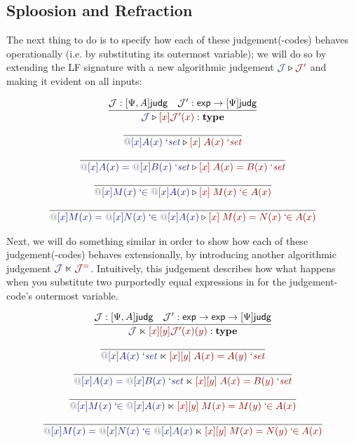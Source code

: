 \documentclass[acmtoplas]{acmtrans2m}
\makeatletter
\def\InputModeColorName{MidnightBlue}
\def\OutputModeColorName{Maroon}
\newcommand\InputMode[1]{{\color{\InputModeColorName}{#1}}}
\newcommand\OutputMode[1]{{\color{\OutputModeColorName}{#1}}}
\newcommand\type{\mathbf{type}}
\newcommand\sortexp{\mathsf{exp}}
\newcommand\sortj{\mathsf{judg}}
\newcommand\sortoj[1]{[#1]\sortj}
\newcommand\bind[2]{{\color{Gray}@}[#1]#2}
\newcommand\qisset[1]{#1\;`\mathit{set}}
\newcommand\qeqset[2]{#1=#2\;`\mathit{set}}
\newcommand\qmem[2]{#1\;`\!\!\in#2}
\newcommand\qeqmem[3]{#1=#2\;`\!\!\in#3}
\newcommand\sploot[2]{\InputMode{#1}\triangleright\OutputMode{#2}}
\newcommand\refract[2]{\InputMode{#1}\ltimes\OutputMode{#2}}
\newcommand\dname[1]{\mathcal{#1}}
\makeatother
\begin{document}
\subsection{Sploosion and Refraction}

The next thing to do is to specify how each of these judgement(-codes) behaves
operationally (i.e. by substituting its outermost variable); we will do so by
extending the LF signature with a new algorithmic judgement
$\sploot{\dname{J}}{\dname{J}'}$ and making it evident on all inputs:

\begin{gather*}
  \infer{
    \sploot{\dname{J}}{[x]\dname{J}'(x)}:\type
  }{
    \dname{J}:\sortoj{\Psi,A} &
    \dname{J}': \sortexp\to\sortoj\Psi
  }\\[6pt]
  \infer{
    \sploot{
      \qisset{\bind{x}{A(x)}}
    }{
      [x]\; \qisset{A(x)}
    }
  }{
  }\\[6pt]
  \infer{
    \sploot{
      \qeqset{\bind{x}{A(x)}}{\bind{x}{B(x)}}
    }{
      [x]\; \qeqset{A(x)}{B(x)}
    }
  }{
  }\\[6pt]
  \infer{
    \sploot{
      \qmem{\bind{x}{M(x)}}{\bind{x}{A(x)}}
    }{
      [x]\; \qmem{M(x)}{A(x)}
    }
  }{
  }\\[6pt]
  \infer{
    \sploot{
      \qeqmem{\bind{x}{M(x)}}{\bind{x}{N(x)}}{\bind{x}{A(x)}}
    }{
      [x]\; \qeqmem{M(x)}{N(x)}{A(x)}
    }
  }{
  }
\end{gather*}

Next, we will do something similar in order to show how each of these
judgement(-codes) behaves extensionally, by introducing another algorithmic
judgement $\refract{\dname{J}}{\dname{J}^=}$. Intuitively, this judgement
describes how what happens when you substitute two purportedly equal
expressions in for the judgement-code's outermost variable.

\begin{gather*}
  \infer{
    \refract{\dname{J}}{[x][y]\dname{J}'(x)(y)}:\type
  }{
    \dname{J}:\sortoj{\Psi,A} &
    \dname{J}': \sortexp\to\sortexp\to\sortoj\Psi
  }\\[6pt]
  \infer{
    \refract{
      \qisset{\bind{x}{A(x)}}
    }{
      [x][y]\; \qeqset{A(x)}{A(y)}
    }
  }{
  }\\[6pt]
  \infer{
    \refract{
      \qeqset{\bind{x}{A(x)}}{\bind{x}{B(x)}}
    }{
      [x][y]\; \qeqset{A(x)}{B(y)}
    }
  }{
  }\\[6pt]
  \infer{
    \refract{
      \qmem{\bind{x}{M(x)}}{\bind{x}{A(x)}}
    }{
      [x][y]\; \qeqmem{M(x)}{M(y)}{A(x)}
    }
  }{
  }\\[6pt]
  \infer{
    \refract{
      \qeqmem{\bind{x}{M(x)}}{\bind{x}{N(x)}}{\bind{x}{A(x)}}
    }{
      [x][y]\; \qeqmem{M(x)}{N(y)}{A(x)}
    }
  }{
  }
\end{gather*}
\end{document}
